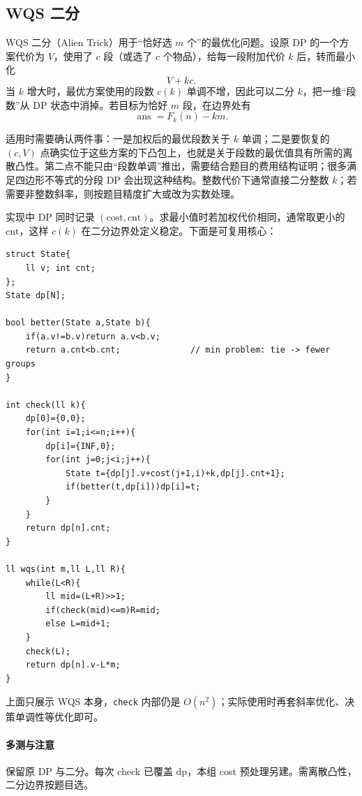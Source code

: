 \subsection{WQS 二分}
WQS 二分（Alien Trick）用于“恰好选 $m$ 个”的最优化问题。设原 DP 的一个方案代价为 $V$，使用了 $c$ 段（或选了 $c$ 个物品），给每一段附加代价 $k$ 后，转而最小化
\[
    V+kc.
\]
当 $k$ 增大时，最优方案使用的段数 $c(k)$ 单调不增，因此可以二分 $k$，把一维“段数”从 DP 状态中消掉。若目标为恰好 $m$ 段，在边界处有
\[
    \operatorname{ans}=F_k(n)-km.
\]

适用时需要确认两件事：一是加权后的最优段数关于 $k$ 单调；二是要恢复的 $(c,V)$ 点确实位于这些方案的下凸包上，也就是关于段数的最优值具有所需的离散凸性。第二点不能只由“段数单调”推出，需要结合题目的费用结构证明；很多满足四边形不等式的分段 DP 会出现这种结构。整数代价下通常直接二分整数 $k$；若需要非整数斜率，则按题目精度扩大或改为实数处理。

实现中 DP 同时记录 $(\text{cost},\text{cnt})$。求最小值时若加权代价相同，通常取更小的 $\text{cnt}$，这样 $c(k)$ 在二分边界处定义稳定。下面是可复用核心：
\begin{lstlisting}
struct State{
    ll v; int cnt;
};
State dp[N];

bool better(State a,State b){
    if(a.v!=b.v)return a.v<b.v;
    return a.cnt<b.cnt;              // min problem: tie -> fewer groups
}

int check(ll k){
    dp[0]={0,0};
    for(int i=1;i<=n;i++){
        dp[i]={INF,0};
        for(int j=0;j<i;j++){
            State t={dp[j].v+cost(j+1,i)+k,dp[j].cnt+1};
            if(better(t,dp[i]))dp[i]=t;
        }
    }
    return dp[n].cnt;
}

ll wqs(int m,ll L,ll R){
    while(L<R){
        ll mid=(L+R)>>1;
        if(check(mid)<=m)R=mid;
        else L=mid+1;
    }
    check(L);
    return dp[n].v-L*m;
}
\end{lstlisting}
上面只展示 WQS 本身，\texttt{check} 内部仍是 $O(n^2)$；实际使用时再套斜率优化、决策单调性等优化即可。

\paragraph{多测与注意} 保留原 DP 与二分。每次 check 已覆盖 dp，本组 cost 预处理另建。需离散凸性，二分边界按题目选。
